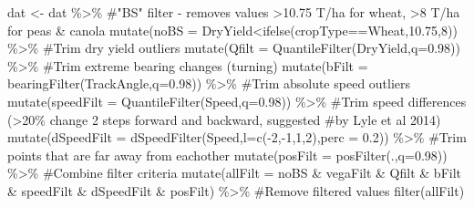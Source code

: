 \documentclass[]{elsarticle} %
\newenvironment{Shaded}{}{}
\newcommand{\AttributeTok}[1]{#1}
\newcommand{\CommentTok}[1]{\textcolor[rgb]{0.00,0.50,0.00}{#1}}
\newcommand{\DecValTok}[1]{#1}
\newcommand{\FloatTok}[1]{#1}
\newcommand{\FunctionTok}[1]{#1}
\newcommand{\NormalTok}[1]{#1}
\newcommand{\OtherTok}[1]{\textcolor[rgb]{1.00,0.25,0.00}{#1}}
\newcommand{\SpecialCharTok}[1]{\textcolor[rgb]{0.00,0.50,0.50}{#1}}
\newcommand{\StringTok}[1]{\textcolor[rgb]{0.00,0.50,0.50}{#1}}
\begin{document}
\begin{Shaded}
\begin{Highlighting}[]
\NormalTok{dat }\OtherTok{\textless{}{-}}\NormalTok{ dat }\SpecialCharTok{\%\textgreater{}\%} 
  \CommentTok{\#"BS" filter {-} removes values \textgreater{}10.75 T/ha for wheat, \textgreater{}8 T/ha for peas \& canola}
  \FunctionTok{mutate}\NormalTok{(}\AttributeTok{noBS =}\NormalTok{ DryYield}\SpecialCharTok{\textless{}}\FunctionTok{ifelse}\NormalTok{(cropType}\SpecialCharTok{==}\StringTok{\textquotesingle{}Wheat\textquotesingle{}}\NormalTok{,}\FloatTok{10.75}\NormalTok{,}\DecValTok{8}\NormalTok{)) }\SpecialCharTok{\%\textgreater{}\%} 
  \CommentTok{\#Trim dry yield outliers}
  \FunctionTok{mutate}\NormalTok{(}\AttributeTok{Qfilt =} \FunctionTok{QuantileFilter}\NormalTok{(DryYield,}\AttributeTok{q=}\FloatTok{0.98}\NormalTok{)) }\SpecialCharTok{\%\textgreater{}\%} 
  \CommentTok{\#Trim extreme bearing changes (turning)}
  \FunctionTok{mutate}\NormalTok{(}\AttributeTok{bFilt =} \FunctionTok{bearingFilter}\NormalTok{(TrackAngle,}\AttributeTok{q=}\FloatTok{0.98}\NormalTok{)) }\SpecialCharTok{\%\textgreater{}\%} 
  \CommentTok{\#Trim absolute speed outliers}
  \FunctionTok{mutate}\NormalTok{(}\AttributeTok{speedFilt =} \FunctionTok{QuantileFilter}\NormalTok{(Speed,}\AttributeTok{q=}\FloatTok{0.98}\NormalTok{)) }\SpecialCharTok{\%\textgreater{}\%} 
  \CommentTok{\#Trim speed differences (\textgreater{}20\% change 2 steps forward and backward, suggested}
  \CommentTok{\#by Lyle et al 2014)}
  \FunctionTok{mutate}\NormalTok{(}\AttributeTok{dSpeedFilt =} \FunctionTok{dSpeedFilter}\NormalTok{(Speed,}\AttributeTok{l=}\FunctionTok{c}\NormalTok{(}\SpecialCharTok{{-}}\DecValTok{2}\NormalTok{,}\SpecialCharTok{{-}}\DecValTok{1}\NormalTok{,}\DecValTok{1}\NormalTok{,}\DecValTok{2}\NormalTok{),}\AttributeTok{perc =} \FloatTok{0.2}\NormalTok{)) }\SpecialCharTok{\%\textgreater{}\%} 
  \CommentTok{\#Trim points that are far away from eachother}
  \FunctionTok{mutate}\NormalTok{(}\AttributeTok{posFilt =} \FunctionTok{posFilter}\NormalTok{(.,}\AttributeTok{q=}\FloatTok{0.98}\NormalTok{)) }\SpecialCharTok{\%\textgreater{}\%} 
  \CommentTok{\#Combine filter criteria}
  \FunctionTok{mutate}\NormalTok{(}\AttributeTok{allFilt =}\NormalTok{ noBS }\SpecialCharTok{\&}\NormalTok{ vegaFilt }\SpecialCharTok{\&}\NormalTok{ Qfilt }\SpecialCharTok{\&}\NormalTok{ bFilt }\SpecialCharTok{\&}\NormalTok{ speedFilt }\SpecialCharTok{\&} 
\NormalTok{           dSpeedFilt }\SpecialCharTok{\&}\NormalTok{ posFilt) }\SpecialCharTok{\%\textgreater{}\%}  
  \CommentTok{\#Remove filtered values}
  \FunctionTok{filter}\NormalTok{(allFilt)}
\end{Highlighting}
\end{Shaded}
\end{document}
